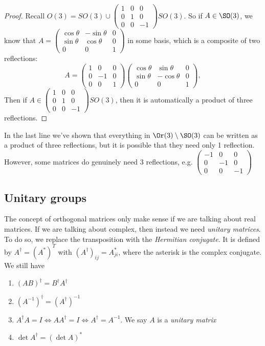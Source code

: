 \documentclass[a4paper]{article}
\begin{document}
\begin{proof}
  Recall $O(3) = SO(3) \cup
  \begin{pmatrix}
    1 & 0 & 0\\
    0 & 1 & 0\\
    0 & 0 & -1
  \end{pmatrix}SO(3)$.
  So if $A\in \SO(3)$, we know that $A =
  \begin{pmatrix}
    \cos\theta & -\sin\theta & 0\\
    \sin\theta & \cos\theta & 0\\
    0 & 0 & 1
  \end{pmatrix}$ in some basis, which is a composite of two reflections:
  \[
    A =
    \begin{pmatrix}
      1 & 0 & 0\\
      0 & -1 & 0\\
      0 & 0 & 1
    \end{pmatrix}
    \begin{pmatrix}
      \cos\theta & \sin\theta & 0\\
      \sin\theta & -\cos\theta & 0\\
      0 & 0 & 1
    \end{pmatrix},
  \]
  Then if $A\in \begin{pmatrix}
    1 & 0 & 0\\
    0 & 1 & 0\\
    0 & 0 & -1
  \end{pmatrix}SO(3)$, then it is automatically a product of three reflections.
\end{proof}
In the last line we've shown that everything in $\Or(3)\setminus \SO(3)$ can be written as a product of three reflections, but it is possible that they need only 1 reflection. However, some matrices do genuinely need 3 reflections, e.g.
$\begin{pmatrix}
  -1 & 0 & 0\\
  0 & -1 & 0\\
  0 & 0 & -1
\end{pmatrix}$

\subsection{Unitary groups}
The concept of orthogonal matrices only make sense if we are talking about real matrices. If we are talking about complex, then instead we need \emph{unitary matrices}. To do so, we replace the transposition with the \emph{Hermitian conjugate}. It is defined by $A^\dagger = (A^*)^T$ with $(A^\dagger)_{ij} = A_{ji}^*$, where the asterisk is the complex conjugate. We still have
\begin{enumerate}
  \item $(AB)^\dagger = B^\dagger A^\dagger$
  \item $(A^{-1})^\dagger = (A^\dagger)^{-1}$
  \item $A^\dagger A = I \Leftrightarrow AA^\dagger = I \Leftrightarrow A^\dagger = A^{-1}$. We say $A$ is a \emph{unitary matrix}
  \item $\det A^{\dagger} = (\det A)^*$
\end{enumerate}
\end{document}
